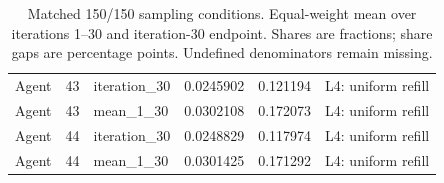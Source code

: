 \begin{table}[htbp!]
\begin{tabular}{lrlrrl}
Agent & 43 & iteration\_30 & 0.0245902 & 0.121194 & L4: uniform refill \\
Agent & 43 & mean\_1\_30 & 0.0302108 & 0.172073 & L4: uniform refill \\
Agent & 44 & iteration\_30 & 0.0248829 & 0.117974 & L4: uniform refill \\
Agent & 44 & mean\_1\_30 & 0.0301425 & 0.171292 & L4: uniform refill \\
\hline
\end{tabular}
\caption{Matched 150/150 sampling conditions. Equal-weight mean over iterations 1--30 and iteration-30 endpoint. Shares are fractions; share gaps are percentage points. Undefined denominators remain missing.}
\label{chap:results:tab:rq1_sampling_coverage}
\end{table}
